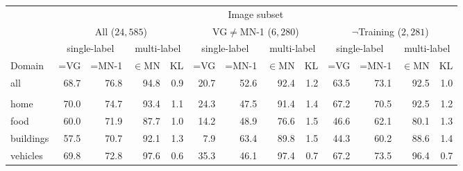 \begin{table*}
	\centering
	\small
	\begin{tabular}{l@{~}|@{~}r@{~}r@{~}rr@{~}|@{~}r@{~}r@{~}rr@{~}|@{~}r@{~}r@{~}rr}
		\toprule
		& \multicolumn{12}{c}{Image subset} \\
		&	\multicolumn{4}{c}{All ($24,585$)} 
		& \multicolumn{4}{c}{VG$\neq$MN-1 ($6,280$)}
		& \multicolumn{4}{c}{$\neg$Training ($2,281$)} \\
		\midrule
		&  \multicolumn{2}{c}{single-label}
		&  \multicolumn{2}{c}{multi-label}
		&  \multicolumn{2}{c}{single-label}
		&  \multicolumn{2}{c}{multi-label}
		&  \multicolumn{2}{c}{single-label}
		&  \multicolumn{2}{c}{multi-label} \\
		Domain	 &  =VG & =MN-1 & $\in$MN  &  KL
		&  =VG & =MN-1 & $\in$MN  & KL
		&  =VG & =MN-1 & $\in$MN  & KL\\
		\midrule
		all            &               68.7 &                 76.8 &                   94.8 &            0.9 &            20.7 &              52.6 &                92.4 &         1.2 &             63.5 &               73.1 &                 92.5 &          1.0 \\ \\
		home           &               70.0 &                 74.7 &                   93.4 &            1.1 &            24.3 &              47.5 &                91.4 &         1.4 &             67.2 &               70.5 &                 92.5 &          1.2 \\
		food           &               60.0 &                 71.9 &                   87.7 &            1.0 &            14.2 &              48.9 &                76.6 &         1.5 &             46.6 &               62.1 &                 80.1 &          1.3 \\
		buildings      &               57.5 &                 70.7 &                   92.1 &            1.3 &             7.9 &              63.4 &                89.8 &         1.5 &             44.3 &               60.2 &                 88.6 &          1.4 \\
		vehicles       &               69.8 &                 72.8 &                   97.6 &            0.6 &            35.3 &              46.1 &                97.4 &         0.7 &             67.2 &               73.5 &                 96.4 &          0.7 \\

\end{tabular}
\end{table*}
